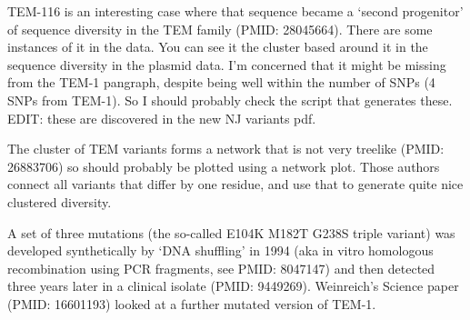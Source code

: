 \documentclass[aps,rmp,preprint,superscriptaddress,10pt,twocolumn]{revtex4-1}
\begin{document}
TEM-116 is an interesting case where that sequence became a `second progenitor' of sequence diversity in the TEM family (PMID: 28045664). There are some instances of it in the data. You can see it the cluster based around it in the sequence diversity in the plasmid data. I'm concerned that it might be missing from the TEM-1 pangraph, despite being well within the number of SNPs (4 SNPs from TEM-1). So I should probably check the script that generates these. EDIT: these are discovered in the new NJ variants pdf. 

The cluster of TEM variants forms a network that is not very treelike (PMID: 26883706) so should probably be plotted using a network plot. Those authors connect all variants that differ by one residue, and use that to generate quite nice clustered diversity. 

A set of three mutations (the so-called E104K M182T G238S triple variant) was developed synthetically by `DNA shuffling' in 1994 (aka  in vitro homologous recombination using PCR fragments, see PMID: 8047147) and then detected three years later in a clinical isolate (PMID: 9449269). Weinreich's Science paper (PMID: 16601193) looked at a further mutated version of TEM-1. 
\end{document}
